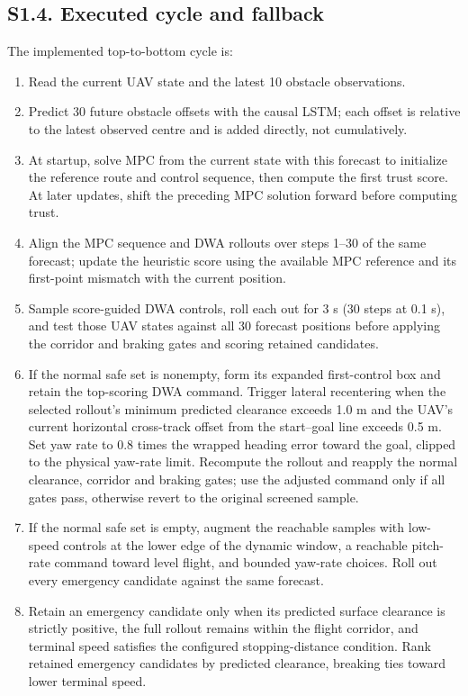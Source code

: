 \documentclass[10pt]{article}
\begin{document}
\subsection*{S1.4. Executed cycle and fallback}
The implemented top-to-bottom cycle is:
\begin{enumerate}
\item Read the current UAV state and the latest 10 obstacle observations.
\item Predict 30 future obstacle offsets with the causal LSTM; each offset is relative to the latest observed centre and is added directly, not cumulatively.
\item At startup, solve MPC from the current state with this forecast to initialize the reference route and control sequence, then compute the first trust score. At later updates, shift the preceding MPC solution forward before computing trust.
\item Align the MPC sequence and DWA rollouts over steps 1--30 of the same forecast; update the heuristic score using the available MPC reference and its first-point mismatch with the current position.
\item Sample score-guided DWA controls, roll each out for 3 s (30 steps at 0.1 s), and test those UAV states against all 30 forecast positions before applying the corridor and braking gates and scoring retained candidates.
\item If the normal safe set is nonempty, form its expanded first-control box and retain the top-scoring DWA command. Trigger lateral recentering when the selected rollout's minimum predicted clearance exceeds 1.0 m and the UAV's current horizontal cross-track offset from the start--goal line exceeds 0.5 m. Set yaw rate to 0.8 times the wrapped heading error toward the goal, clipped to the physical yaw-rate limit. Recompute the rollout and reapply the normal clearance, corridor and braking gates; use the adjusted command only if all gates pass, otherwise revert to the original screened sample.
\item If the normal safe set is empty, augment the reachable samples with low-speed controls at the lower edge of the dynamic window, a reachable pitch-rate command toward level flight, and bounded yaw-rate choices. Roll out every emergency candidate against the same forecast.
\item Retain an emergency candidate only when its predicted surface clearance is strictly positive, the full rollout remains within the flight corridor, and terminal speed satisfies the configured stopping-distance condition. Rank retained emergency candidates by predicted clearance, breaking ties toward lower terminal speed.

\end{enumerate}
\end{document}
